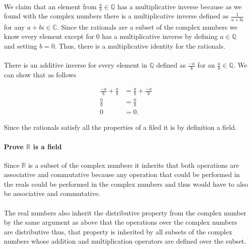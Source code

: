\documentclass{article}
\begin{document}
      \paragraph{}
      We claim that an element from $\frac{a}{b} \in \mathbb{Q}$ has a multiplicative inverse because as we found with the complex numbers there is a multiplicative inverse defined as $\frac{1}{a+bi}$ for any $a+bi \in \mathbb{C}$. Since the rationals are a subset of the complex numbers we know every element except for 0 has a multiplicative inverse by defining $a \in \mathbb{Q}$ and setting $b=0$. Thus, there is a multiplicative identity for the rationals.

      \paragraph{}
      There is an additive inverse for every element in $\mathbb{Q}$ defined as $\frac{-a}{b}$ for an $\frac{a}{b} \in \mathbb{Q}$. We can show that as follows

      \[
        \begin{split}
          \frac{-a}{b} + \frac{a}{b} &= \frac{a}{b} + \frac{-a}{b}\\
          \frac{0}{b} &= \frac{0}{b}\\
          0 &= 0.
        \end{split}
      \]

      Since the rationals satisfy all the properties of a filed it is by definition a field.

      \paragraph{Prove $\mathbb{R}$ is a field}
      Since $\mathbb{R}$ is a subset of the complex numbers it inherits that both operations are associative and commutative because any operation that could be performed in the reals could be performed in the complex numbers and thus would have to also be associative and commutative.

      \paragraph{}
      The real numbers also inherit the distributive property from the complex number by the same argument as above that the operations over the complex numbers are distributive thus, that property is inherited by all subsets of the complex numbers whose addition and multiplication operators are defined over the subset.
\end{document}
